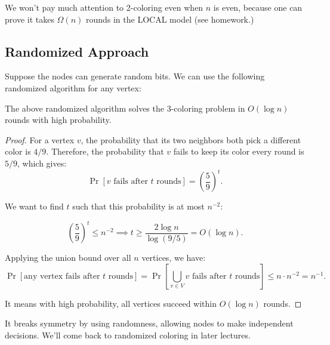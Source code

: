 \begin{remark}
  We won't pay much attention to 2-coloring even when $n$ is even, because one can prove it takes $\Omega(n)$ rounds in the LOCAL model (see homework.)
\end{remark}

\subsection{Randomized Approach}

Suppose the nodes can generate random bits. We can use the following randomized algorithm for any vertex:

\begin{algorithm}[H]
  \caption{Randomized 3-coloring Algorithm}
\end{algorithm}
  
\begin{theorem}
  The above randomized algorithm solves the 3-coloring problem in $O(\log n)$ rounds with high probability.
\end{theorem}

\begin{proof}
  For a vertex $v$, the probability that its two neighbors both pick a different color is $4/9$. Therefore, the probability that $v$ fails to keep its color every round is $5/9$, which gives:
  \[
    \Pr[\text{$v$ fails after $t$ rounds}] = \left(\frac{5}{9}\right)^t.
  \]

  We want to find $t$ such that this probability is at most $n^{-2}$:

  \[
    \left(\frac{5}{9}\right)^t \leq n^{-2} \implies t \geq \frac{2 \log n}{\log(9/5)} = O(\log n).
  \]

  Applying the union bound over all $n$ vertices, we have:
  \[
    \Pr[\text{any vertex fails after $t$ rounds}] = \Pr\left[\bigcup_{v \in V} \text{$v$ fails after $t$ rounds}\right] \leq n \cdot n^{-2} = n^{-1}.
  \]

  It means with high probability, all vertices succeed within $O(\log n)$ rounds.
\end{proof}

It breaks symmetry by using randomness, allowing nodes to make independent decisions. We'll come back to randomized coloring in later lectures.

